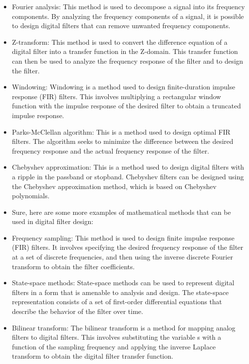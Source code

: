     \begin{itemize}
        \setlength\itemsep{-0.3em}
        \item Fourier analysis: This method is used to decompose a signal into its frequency components. By analyzing the frequency components of a signal, it is possible to design digital filters that can remove unwanted frequency components.
        \item Z-transform: This method is used to convert the difference equation of a digital filter into a transfer function in the Z-domain. This transfer function can then be used to analyze the frequency response of the filter and to design the filter.
        \item Windowing: Windowing is a method used to design finite-duration impulse response (FIR) filters. This involves multiplying a rectangular window function with the impulse response of the desired filter to obtain a truncated impulse response.
        \item Parks-McClellan algorithm: This is a method used to design optimal FIR filters. The algorithm seeks to minimize the difference between the desired frequency response and the actual frequency response of the filter.
        \item Chebyshev approximation: This is a method used to design digital filters with a ripple in the passband or stopband. Chebyshev filters can be designed using the Chebyshev approximation method, which is based on Chebyshev polynomials.
        \item Sure, here are some more examples of mathematical methods that can be used in digital filter design:
        \item Frequency sampling: This method is used to design finite impulse response (FIR) filters. It involves specifying the desired frequency response of the filter at a set of discrete frequencies, and then using the inverse discrete Fourier transform to obtain the filter coefficients.
        \item State-space methods: State-space methods can be used to represent digital filters in a form that is amenable to analysis and design. The state-space representation consists of a set of first-order differential equations that describe the behavior of the filter over time.
        \item Bilinear transform: The bilinear transform is a method for mapping analog filters to digital filters. This involves substituting the variable s with a function of the sampling frequency and applying the inverse Laplace transform to obtain the digital filter transfer function.

\end{itemize}
